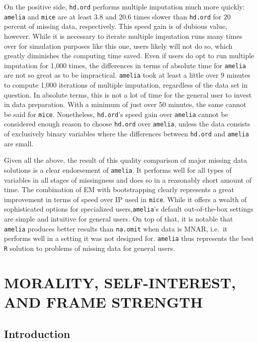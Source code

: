 \documentclass[12pt,econ]{sources/authesis}
\begin{document}
On the positive side, \texttt{hd.ord} performs multiple imputation much more quickly: \texttt{amelia} and \texttt{mice} are at least 3.8 and 20.6 times slower than \texttt{hd.ord} for 20 percent of missing data, respectively. This speed gain is of dubious value, however. While it is necessary to iterate multiple imputation runs many times over for simulation purposes like this one, users likely will not do so, which greatly diminishes the computing time saved. Even if users do opt to run multiple imputation for 1,000 times, the differences in terms of absolute time for \texttt{amelia} are not so great as to be impractical. \texttt{amelia} took at least a little over 9 minutes to compute 1,000 iterations of multiple imputation, regardless of the data set in question. In absolute terms, this is not a lot of time for the general user to invest in data preparation. With a minimum of just over 50 minutes, the same cannot be said for \texttt{mice}. Nonetheless, \texttt{hd.ord}'s speed gain over \texttt{amelia} cannot be considered enough reason to choose \texttt{hd.ord} over \texttt{amelia}, unless the data consists of exclusively binary variables where the differences between \texttt{hd.ord} and \texttt{amelia} are small.

Given all the above, the result of this quality comparison of major missing data solutions is a clear endorsement of \texttt{amelia}. It performs well for all types of variables in all stages of missingness and does so in a reasonably short amount of time. The combination of EM with bootstrapping clearly represents a great improvement in terms of speed over IP used in \texttt{mice}. While it offers a wealth of sophisticated options for specialized users,\texttt{amelia}'s default out-of-the-box settings are simple and intuitive for general users. On top of that, it is notable that \texttt{amelia} produces better results than \texttt{na.omit} when data is MNAR, i.e.~it performs well in a setting it was not designed for. \texttt{amelia} thus represents the best \texttt{R} solution to problems of missing data for general users.

\hypertarget{framing}{%
\chapter{MORALITY, SELF-INTEREST, AND FRAME STRENGTH}\label{framing}}

\hypertarget{framing-intro}{%
\section{Introduction}\label{framing-intro}}
\end{document}
